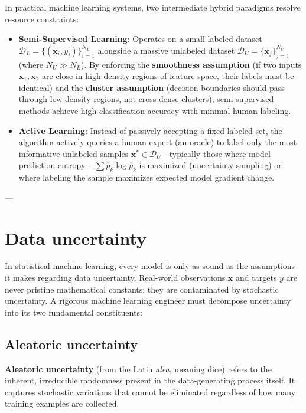 In practical machine learning systems, two intermediate hybrid paradigms resolve resource constraints:
\begin{itemize}
  \item \textbf{Semi-Supervised Learning}: Operates on a small labeled dataset $\mathcal{D}_L = \{(\mathbf{x}_i, y_i)\}_{i=1}^{N_L}$ alongside a massive unlabeled dataset $\mathcal{D}_U = \{\mathbf{x}_j\}_{j=1}^{N_U}$ (where $N_U \gg N_L$). By enforcing the \textbf{smoothness assumption} (if two inputs $\mathbf{x}_1, \mathbf{x}_2$ are close in high-density regions of feature space, their labels must be identical) and the \textbf{cluster assumption} (decision boundaries should pass through low-density regions, not cross dense clusters), semi-supervised methods achieve high classification accuracy with minimal human labeling.
  \item \textbf{Active Learning}: Instead of passively accepting a fixed labeled set, the algorithm actively queries a human expert (an oracle) to label only the most informative unlabeled samples $\mathbf{x}^* \in \mathcal{D}_U$---typically those where model prediction entropy $-\sum \hat{p}_k \log \hat{p}_k$ is maximized (uncertainty sampling) or where labeling the sample maximizes expected model gradient change.
\end{itemize}

---

\section{Data uncertainty}
\label{sec:data_uncertainty}

In statistical machine learning, every model is only as sound as the assumptions it makes regarding data uncertainty. Real-world observations $\mathbf{x}$ and targets $y$ are never pristine mathematical constants; they are contaminated by stochastic uncertainty. A rigorous machine learning engineer must decompose uncertainty into its two fundamental constituents:

\subsection{Aleatoric uncertainty}
\label{sec:aleatoric_uncertainty}

\textbf{Aleatoric uncertainty} (from the Latin \emph{alea}, meaning dice) refers to the inherent, irreducible randomness present in the data-generating process itself. It captures stochastic variations that cannot be eliminated regardless of how many training examples are collected.

